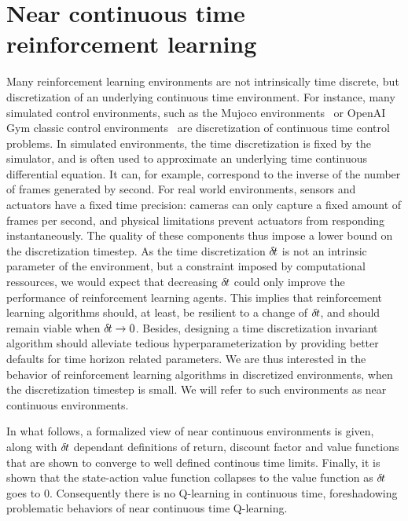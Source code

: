 \section{Near continuous time reinforcement learning}
\label{sec:framework}

  Many reinforcement learning environments are not intrinsically time
	discrete, but discretization of an underlying continuous time
	environment. For instance, many simulated control environments, such as the
	Mujoco environments~\cite{ddpg} or OpenAI Gym classic control
	environments~\cite{gym} are discretization of continuous time control problems.
	In simulated environments, the time discretization is fixed by the simulator,
	and is often used to approximate an underlying time continuous differential equation.
	It can, for example, correspond to the inverse of the number of frames generated by second.
	For real world environments, sensors and actuators have a fixed time precision: cameras can
	only capture a fixed amount of frames per second, and physical limitations prevent actuators
	from responding instantaneously. The quality of these components thus impose
	a lower bound on the discretization timestep. As the time discretization 
	${\delta\hspace{-.1em}t}$ is not an intrinsic parameter of the environment, but a constraint imposed by
	computational ressources, we would expect that decreasing ${\delta\hspace{-.1em}t}$
	could  only improve the performance of reinforcement learning agents.
	This implies that reinforcement learning algorithms should, at least, be
	resilient to a change of ${\delta\hspace{-.1em}t}$, and should remain viable when
	${\delta\hspace{-.1em}t} \rightarrow 0$. Besides, designing a time discretization invariant algorithm
	should alleviate tedious hyperparameterization by providing better defaults
	for time horizon related parameters.
	We are thus interested in the behavior of
	reinforcement learning algorithms in discretized environments, when the
	discretization timestep is small. We will refer to such environments as
	near continuous environments.

	In what follows, a formalized view of near continuous environments is given,
	along with ${\delta\hspace{-.1em}t}$ dependant definitions of return, discount factor and
	value functions that are shown to converge to well defined continous time limits. Finally, it is shown
	that the state-action value function collapses to the value function as
	${\delta\hspace{-.1em}t}$ goes to $0$. Consequently there is no Q-learning in
	continuous time, foreshadowing problematic behaviors of near continuous time Q-learning.
